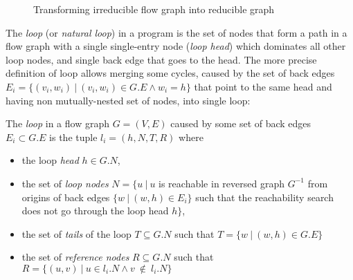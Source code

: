 
\begin{figure}
\centering
{}
\caption{Transforming irreducible flow graph into reducible graph~\cite{aho2007compilers::handling_irreducible}} \label{fig:irr-to-r}
\end{figure}

The \textit{loop} (or \textit{natural loop}) in a program is the set of nodes that form a path in a flow graph with a single single-entry node (\textit{loop head}) which dominates all other loop nodes, and single back edge that goes to the head. The more precise definition of loop allows merging some cycles, caused by the set of back edges $E_i = \{(v_i, w_i) \ | \ (v_i, w_i) \in G.E \land w_i = h \}$ that point to the same head and having non mutually-nested set of nodes, into single loop:


\begin{definition}
The \textit{loop} in a flow graph $G = (V, E)$ caused by some set of back edges $E_i \subset G.E$ is the tuple $l_i = (h, N, T, R)$ where
\begin{itemize}
\item the loop \textit{head} $h \in G.N$,
\item the set of \textit{loop nodes} $N = \{ u \ | \ u$ is reachable in reversed graph $G^{-1}$ from origins of back edges $\{w \ | \ (w, h) \in E_i\}$ such that the reachability search does not go through the loop head $h \}$,
\item the set of \textit{tails} of the loop $T \subseteq G.N$ such that $T = \{w \ | \ (w, h) \in G.E\}$
\item the set of \textit{reference nodes} $R \subseteq G.N$ such that $R = \{(u,v) \ | \ u \in l_i.N \land v~\notin~l_i.N\}$
\end{itemize}

\end{definition}

